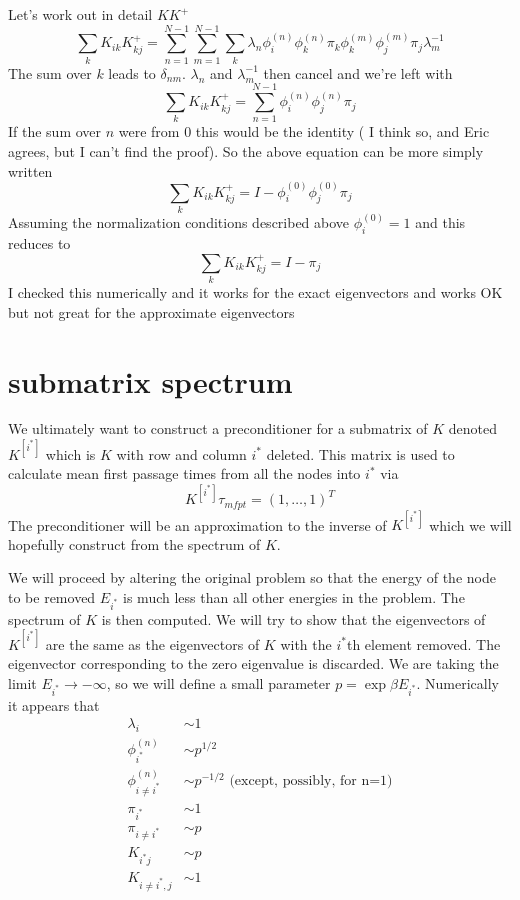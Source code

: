 \documentclass[a4paper]{article}
\newcommand{\evec}[2]{\phi^{(#2)}_{#1}}
\newcommand{\subK}{K^{[i^{*}]}}
\begin{document}
Let's work out in detail $K K^{+}$
\begin{equation}
\sum_k K_{ik} K^{+}_{kj} = \sum_{n=1}^{N-1} \sum_{m=1}^{N-1} \sum_k
\lambda_n \evec{i}{n} \evec{k}{n} \pi_k \evec{k}{m} \evec{j}{m} \pi_j \lambda_m^{-1}
\end{equation}
The sum over $k$ leads to $\delta_{nm}$.  $\lambda_n$ and $\lambda_m^{-1}$ then cancel and we're left with
\begin{equation}
\sum_k K_{ik} K^{+}_{kj} = \sum_{n=1}^{N-1}
\evec{i}{n} \evec{j}{n} \pi_j
\end{equation}
If the sum over $n$ were from 0 this would be the identity ({\color{red} I think so, and Eric agrees, but I can't find the proof}).
So the above equation can be more simply written
\begin{equation}
\sum_k K_{ik} K^{+}_{kj} = I - \evec{i}{0} \evec{j}{0} \pi_j
\end{equation}
Assuming the normalization conditions described above $\evec{i}{0} = 1$ and this reduces to
\begin{equation}
\sum_k K_{ik} K^{+}_{kj} = I - \pi_j
\end{equation}
I checked this numerically and it works for the exact eigenvectors and works OK but not great for the approximate eigenvectors


\section{submatrix spectrum}
We ultimately want to construct a preconditioner for a submatrix of $K$ denoted $\subK{}$ which is $K$
with row and column $i^{*}$ deleted.  This matrix is used to calculate mean first passage times from all the nodes
into $i^{*}$ via
\begin{equation}
\subK{} \tau_{mfpt} = (1, \dots, 1)^T
\end{equation}
The preconditioner will be an approximation to the inverse of $\subK{}$ which we will hopefully construct from 
the spectrum of $K$.

We will proceed by altering the original problem so that the energy of the node to be removed $E_{i^{*}}$
is much less than all other energies in the problem.  The spectrum of $K$ is then computed.
We will try to show that the eigenvectors of $\subK{}$ are the same as the eigenvectors of $K$ with 
the $i^{*}$th element removed. The eigenvector corresponding to the zero eigenvalue is discarded.
We are taking the limit $E_{i^{*}} \to -\infty$, so we will define a small parameter $p = \exp{\beta E_{i^{*}}}$.
Numerically it appears that
\begin{align}
\lambda_{i} &\sim 1 \\
\evec{i^{*}}{n} &\sim p^{1/2} \\
\evec{i\ne i^{*}}{n} &\sim p^{-1/2} \text{  (except, possibly, for n=1)} \\
\pi_{i^{*}} &\sim 1 \\
\pi_{i\ne i^{*}} &\sim p \\
K_{i^{*} j} &\sim p \\
K_{i\ne i^{*}, j} &\sim 1
\end{align}
\end{document}
